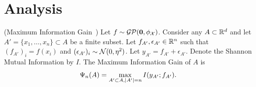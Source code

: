 
\section{Analysis}
\label{sec:analysis}

\begin{definition}(Maximum Information Gain~\citep{srinivas10gpbandits})
Let $f\sim \mathcal{G}\mathcal{P}({\bf 0}, \phi_{\mathcal{X}})$.
Consider any $A\subset\mathbb{R}^d$ and
let $A' = \{x_1, \dots, x_n\} \subset A$ be a finite subset.
Let $f_{A'}, \epsilon_{A'}\in\mathbb{R}^n$ such that $(f_{A'})_i=f(x_i)$ and
$(\epsilon_{A'})_i\sim\mathcal{N}(0,\eta^2)$.
Let $y_{A'} = f_{A'}+\epsilon_{A'}$.
Denote the Shannon Mutual Information by $I$.
The Maximum Information Gain of $A$ is
\[
\Psi_n(A) = \max_{A'\subset A, |A'| = n} I(y_{A'}; f_{A'}).
\]
\label{def:infGain}
\end{definition}
\insertpostspacing


